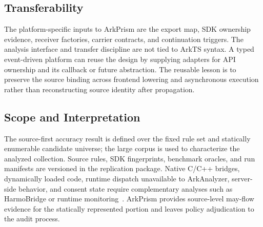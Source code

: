\subsection{Transferability}

The platform-specific inputs to ArkPrism are the export map, SDK ownership evidence, receiver factories, carrier contracts, and continuation triggers. The analysis interface and transfer discipline are not tied to ArkTS syntax. A typed event-driven platform can reuse the design by supplying adapters for API ownership and its callback or future abstraction. The reusable lesson is to preserve the source binding across frontend lowering and asynchronous execution rather than reconstructing source identity after propagation.

\subsection{Scope and Interpretation}

The source-first accuracy result is defined over the fixed rule set and statically enumerable candidate universe; the large corpus is used to characterize the analyzed collection. Source rules, SDK fingerprints, benchmark oracles, and run manifests are versioned in the replication package. Native C/C++ bridges, dynamically loaded code, runtime dispatch unavailable to ArkAnalyzer, server-side behavior, and consent state require complementary analyses such as HarmoBridge or runtime monitoring~\cite{harmobridge}. ArkPrism provides source-level may-flow evidence for the statically represented portion and leaves policy adjudication to the audit process.
